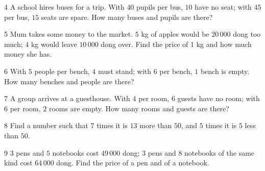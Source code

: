 \gap
\begin{probbox}{4}{\relax}
A school hires buses for a trip. With $40$ pupils per bus, $10$ have no seat; with $45$ per bus, $15$ seats are spare. How many buses and pupils are there?
\end{probbox}
\gap
\begin{probbox}{5}{\relax}
Mum takes some money to the market. $5$ kg of apples would be $20\,000$ dong too much; $4$ kg would leave $10\,000$ dong over. Find the price of $1$ kg and how much money she has.
\end{probbox}
\gap
\begin{probbox}{6}{\relax}
With $5$ people per bench, $4$ must stand; with $6$ per bench, $1$ bench is empty. How many benches and people are there?
\end{probbox}
\gap
\begin{probbox}{7}{\relax}
A group arrives at a guesthouse. With $4$ per room, $6$ guests have no room; with $6$ per room, $2$ rooms are empty. How many rooms and guests are there?
\end{probbox}
\gap
\begin{probbox}{8}{\relax}
Find a number such that $7$ times it is $13$ more than $50$, and $5$ times it is $5$ less than $50$.
\end{probbox}
\gap
\begin{probbox}{9}{\relax}
$3$ pens and $5$ notebooks cost $49\,000$ dong; $3$ pens and $8$ notebooks of the same kind cost $64\,000$ dong. Find the price of a pen and of a notebook.
\end{probbox}
